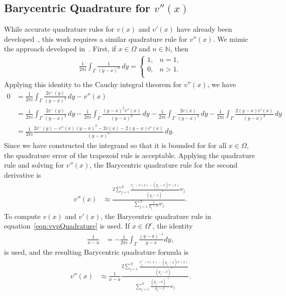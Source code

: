 \documentclass[preprint, 10pt]{elsarticle}
\begin{document}
\subsection{Barycentric Quadrature for $v''(x)$}
While accurate quadrature rules for $v(x)$ and $v'(x)$ have already been
developed~\cite{bar-wu-vee2015}, this work requires a similar quadrature
rule for $v''(x)$.  We mimic the approach developed
in~\cite{bar-wu-vee2015}.  First, if $x \in \Omega$ and $n \in
\mathbb{N}$, then 
\begin{align}
  \frac{1}{2\pi i}\int_{\Gamma} \frac{1}{(y-x)^n}\, dy = 
  \left\{
    \begin{array}{ll}
      1, & n = 1, \\
      0, & n > 1. \\
    \end{array}
  \right.
\end{align}
Applying this identity to the Cauchy integral theorem for $v''(x)$, we
have
\begin{align}
  0 &= \frac{1}{2\pi i} \int_{\Gamma} 
      \frac{2v^{-}(y)}{(y-x)^3}\,dy - v''(x) \\
    &= \frac{1}{2\pi i} \int_{\Gamma} 
      \frac{2v^{-}(y)}{(y-x)^3}\,dy - 
    \frac{1}{2\pi i} \int_{\Gamma} 
      \frac{(y-x)^2 v''(x)}{(y-x)^3}\,dy -
    \frac{1}{2\pi i} \int_{\Gamma} 
      \frac{2v(x)}{(y-x)^3}\, dy -
    \frac{1}{2\pi i} \int_{\Gamma} 
      \frac{2(y-x)v'(x)}{(y-x)^3}\, dy \\
    &= \frac{1}{2\pi i}
      \frac{2v^{-}(y) - v''(x)(y-x)^2 - 2v(x) - 2(y-x)v'(x)}
      {(y-x)^3}\, dy.
\end{align}
Since we have constructed the integrand so that it is bounded for for
all $x \in \Omega$, the quadrature error of the trapezoid rule is
acceptable.  Applying the quadrature rule and solving for $v''(x)$, the
Barycentric quadrature rule for the second derivative is
\begin{align}
  v''(x) &\approx \frac{2\sum\limits_{j=1}^N 
    \frac{v^{-}_{j} - v(x) - (y_j-x)v'(x)}{(y_j-x)^3}w_j}
    {\sum\limits_{j=1}^N \frac{1}{y_j-x}w_j}.
\end{align}
To compute $v(x)$ and $v'(x)$, the Barycentric quadrature rule in
equation~\eqref{eqn:vvpQuadrature} is used. If $x \in \Omega^c$, the
identity
\begin{align}
\frac{1}{x-a} &= -\frac{1}{2\pi i}\int_{\Gamma} 
    \frac{(y-a)^{-1}}{y-x} dy, 
\end{align}
is used, and the resulting Barycentric quadrature formula is
\begin{align}
  v''(x) &\approx \frac{1}{x-a}\frac{2\sum\limits_{j=1}^N
    \frac{v^{+}_{j} - v(x) - (y_j-x)v'(x)}{(y_j-x)^3}}
    {\sum\limits_{j=1}^N \frac{(y_j-a)^{-1}}{y_j-x}w_j}.
\end{align}
\end{document}
